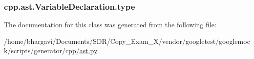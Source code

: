 \subsubsection[{\texorpdfstring{type}{type}}]{\setlength{\rightskip}{0pt plus 5cm}cpp.\+ast.\+Variable\+Declaration.\+type}\hypertarget{classcpp_1_1ast_1_1_variable_declaration_a8c7cc8578ea12f93c6e1c5c6ef4ddf99}{}\label{classcpp_1_1ast_1_1_variable_declaration_a8c7cc8578ea12f93c6e1c5c6ef4ddf99}


The documentation for this class was generated from the following file\+:\begin{DoxyCompactItemize}
\item 
/home/bhargavi/\+Documents/\+S\+D\+R/\+Copy\+\_\+\+Exam\+\_\+X/vendor/googletest/googlemock/scripts/generator/cpp/\hyperlink{ast_8py}{ast.\+py}\end{DoxyCompactItemize}
